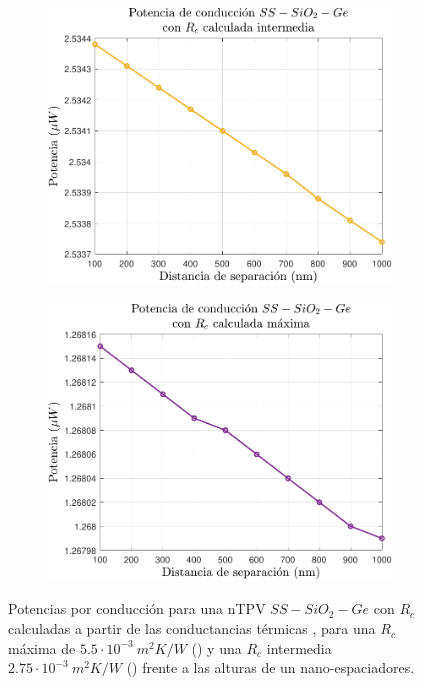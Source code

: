 \begin{figure}[H]
	\centering
	\begin{subfigure}[b]{0.49\textwidth}
		\centering
			\includegraphics[width=1.00\textwidth]{Prc_SsSiO2Ge_Inter.pdf}
		\caption{ }
		\label{fig:Prc_SsSiO2Ge_Inter}
	\end{subfigure}
	\hfill
	\begin{subfigure}[b]{0.49\textwidth}
		\centering
			\includegraphics[width=1.00\textwidth]{Prc_SsSiO2Ge_Max.pdf}
		\caption{ }
		\label{fig:Prc_SsSiO2Ge_Max}
	\end{subfigure}
	\caption[Potencias por conducción para una nTPV $SS-SiO_2-Ge$ con $R_c$ calculadas, con una $R_c$ máxima de  $5.5\cdot 10^{-3} \ m^2 K/W$ () y una $R_c$ intermedia $2.75\cdot 10^{-3} \ m^2 K/W$ () frente a las alturas de un nano-espaciadores.]{Potencias por conducción para una nTPV $SS-SiO_2-Ge$ con $R_c$ calculadas a partir de las conductancias térmicas \cite{experimental_Rc_SS}, para una $R_c$ máxima de  $5.5\cdot 10^{-3} \ m^2 K/W$ () y una $R_c$ intermedia $2.75\cdot 10^{-3} \ m^2 K/W$ () frente a las alturas de un nano-espaciadores.}
	\label{fig:Pcond2_SsSiO2Ge}
\end{figure}
